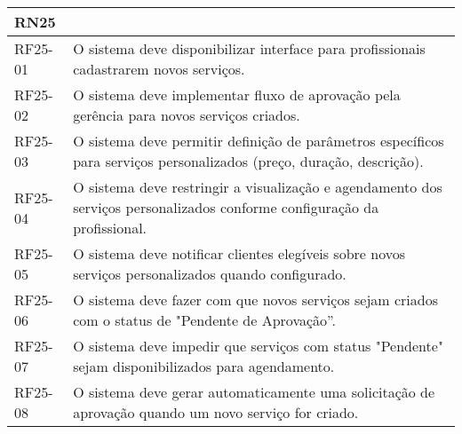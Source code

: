 \begin{longtable}{|p{}|p{}|}
	\multicolumn{2}{|l|}{\textbf{RN25}} \\ \hline
	RF25-01 & O sistema deve disponibilizar interface para profissionais cadastrarem novos serviços. \\ \hline
	RF25-02 & O sistema deve implementar fluxo de aprovação pela gerência para novos serviços criados. \\ \hline
	RF25-03 & O sistema deve permitir definição de parâmetros específicos para serviços personalizados (preço, duração, descrição). \\ \hline
	RF25-04 & O sistema deve restringir a visualização e agendamento dos serviços personalizados conforme configuração da profissional. \\ \hline
	RF25-05 & O sistema deve notificar clientes elegíveis sobre novos serviços personalizados quando configurado. \\ \hline
	RF25-06 & O sistema deve fazer com que novos serviços sejam criados com o status de "Pendente de Aprovação”. \\ \hline
	RF25-07 & O sistema deve impedir que serviços com status "Pendente" sejam disponibilizados para agendamento. \\ \hline
	RF25-08 & O sistema deve gerar automaticamente uma solicitação de aprovação quando um novo serviço for criado. \\ \hline
	

\end{longtable}
